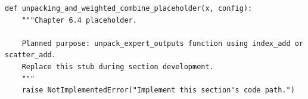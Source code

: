 \begin{lstlisting}[style=bookpython,caption={Planned code placeholder for unpacking and weighted combine.},label={lst:ch06-unpacking-and-weighted-combine}]
def unpacking_and_weighted_combine_placeholder(x, config):
    """Chapter 6.4 placeholder.

    Planned purpose: unpack_expert_outputs function using index_add or scatter_add.
    Replace this stub during section development.
    """
    raise NotImplementedError("Implement this section's code path.")
\end{lstlisting}
